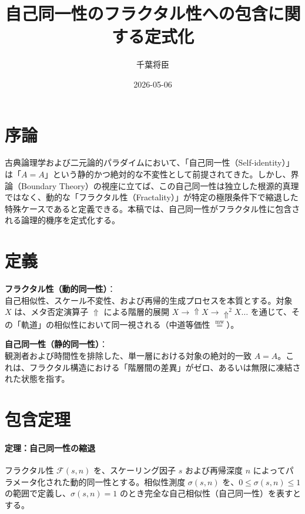\documentclass[11pt,a4paper]{ltjsarticle}
\title{自己同一性のフラクタル性への包含に関する定式化}
\author{千葉将臣}
\date{2026-05-06}
\begin{document}
\maketitle

\section{序論}
古典論理学および二元論的パラダイムにおいて、「自己同一性（Self-identity）」は「$A=A$」という静的かつ絶対的な不変性として前提されてきた。しかし、界論（Boundary Theory）の視座に立てば、この自己同一性は独立した根源的真理ではなく、動的な「フラクタル性（Fractality）」が特定の極限条件下で縮退した特殊ケースであると定義できる。本稿では、自己同一性がフラクタル性に包含される論理的機序を定式化する。

\section{定義}

\begin{description}[style=multiline, leftmargin=3.5cm]
    \item[定義 1.1] \textbf{フラクタル性（動的同一性）}：\\
    自己相似性、スケール不変性、および再帰的生成プロセスを本質とする。対象 $X$ は、メタ否定演算子 $\Uparrow$ による階層的展開 $X \to \Uparrow X \to \Uparrow^2 X \dots$ を通じて、その「軌道」の相似性において同一視される（中道等価性 $\mathrel{\overset{\mathrm{mw}}{=}}$）。
    
    \item[定義 1.2] \textbf{自己同一性（静的同一性）}：\\
    観測者および時間性を排除した、単一層における対象の絶対的一致 $A=A$。これは、フラクタル構造における「階層間の差異」がゼロ、あるいは無限に凍結された状態を指す。
\end{description}

\section{包含定理}

\paragraph{定理：自己同一性の縮退}

フラクタル性 $\mathcal{F}(s, n)$ を、スケーリング因子 $s$ および再帰深度 $n$ によってパラメータ化された動的同一性とする。相似性測度 $\sigma(s, n)$ を、$0 \leq \sigma(s, n) \leq 1$ の範囲で定義し、$\sigma(s, n) = 1$ のとき完全な自己相似性（自己同一性）を表すとする。
\end{document}
